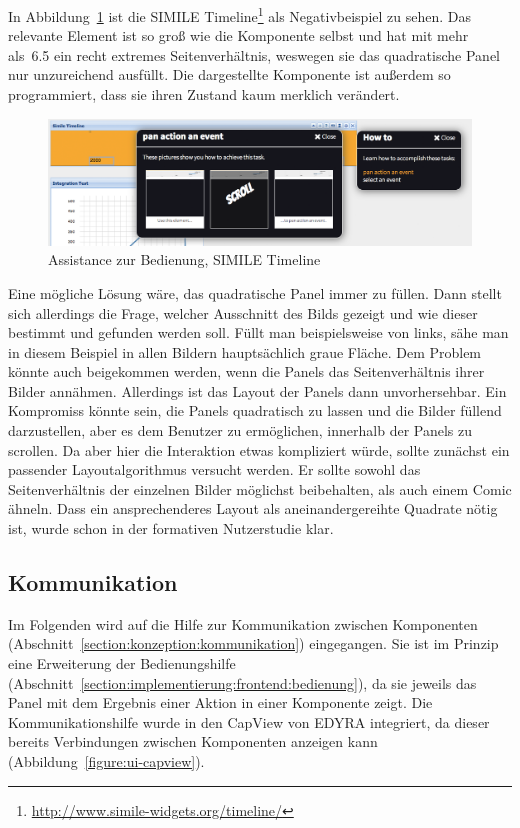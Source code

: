 \documentclass[
	headsepline,
	footsepline,
	fontsize=12pt,
	bibliography=totoc
]{scrbook}
\begin{document}
In Abbildung~\ref{figure:ui-howto-step2-bad} ist die SIMILE Timeline\footnote{\url{http://www.simile-widgets.org/timeline/}} als Negativbeispiel zu sehen. Das relevante Element ist so groß wie die Komponente selbst und hat mit mehr als~6.5 ein recht extremes Seitenverhältnis, weswegen sie das quadratische Panel nur unzureichend ausfüllt. Die dargestellte Komponente ist außerdem so programmiert, dass sie ihren Zustand kaum merklich verändert.

\begin{figure}[htbp]
   \centering
   \includegraphics[width=\textwidth]{images/implementierung-ui-howto-step2-bad.png}
   \caption{Assistance zur Bedienung, SIMILE Timeline}
   \label{figure:ui-howto-step2-bad}
\end{figure}

Eine mögliche Lösung wäre, das quadratische Panel immer zu füllen. Dann stellt sich allerdings die Frage, welcher Ausschnitt des Bilds gezeigt und wie dieser bestimmt und gefunden werden soll. Füllt man beispielsweise von links, sähe man in diesem Beispiel in allen Bildern hauptsächlich graue Fläche. Dem Problem könnte auch beigekommen werden, wenn die Panels das Seitenverhältnis ihrer Bilder annähmen. Allerdings ist das Layout der Panels dann unvorhersehbar. Ein Kompromiss könnte sein, die Panels quadratisch zu lassen und die Bilder füllend darzustellen, aber es dem Benutzer zu ermöglichen, innerhalb der Panels zu scrollen. Da aber hier die Interaktion etwas kompliziert würde, sollte zunächst ein passender Layoutalgorithmus versucht werden. Er sollte sowohl das Seitenverhältnis der einzelnen Bilder möglichst beibehalten, als auch einem Comic ähneln. Dass ein ansprechenderes Layout als aneinandergereihte Quadrate nötig ist, wurde schon in der formativen Nutzerstudie klar. 

\subsection{Kommunikation}
\label{section:implementierung:frontend:kommunikation}

Im Folgenden wird auf die Hilfe zur Kommunikation zwischen Komponenten (Abschnitt~\ref{section:konzeption:kommunikation}) eingegangen. Sie ist im Prinzip eine Erweiterung der Bedienungshilfe (Abschnitt~\ref{section:implementierung:frontend:bedienung}), da sie jeweils das Panel mit dem Ergebnis einer Aktion in einer Komponente zeigt. Die Kommunikationshilfe wurde in den CapView von EDYRA \cite{Radeck2013} integriert, da dieser bereits Verbindungen zwischen Komponenten anzeigen kann (Abbildung~\ref{figure:ui-capview}).
\end{document}

